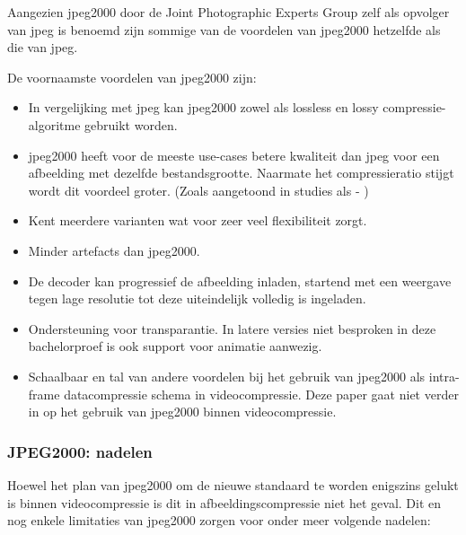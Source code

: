 Aangezien \gls{jpeg2000} door de Joint Photographic Experts Group zelf als opvolger van \gls{jpeg} is benoemd zijn sommige van de voordelen van \gls{jpeg2000} hetzelfde als die van \gls{jpeg}.

De voornaamste voordelen van \gls{jpeg2000} zijn:

\begin{itemize}
	\item In vergelijking met \gls{jpeg} kan \gls{jpeg2000} zowel als \gls{lossless} en \gls{lossy} \gls{compressie-algoritme} gebruikt worden.
	
	\item \gls{jpeg2000} heeft voor de meeste \glspl{use-case} betere kwaliteit dan \gls{jpeg} voor een afbeelding met dezelfde bestandsgrootte. Naarmate het compressieratio stijgt wordt dit voordeel groter. (Zoals aangetoond in studies als  - \cite{jpegvsjpeg2000quality})
	
	\item Kent meerdere varianten wat voor zeer veel flexibiliteit zorgt.
	
	\item Minder \glspl{artefact} dan \gls{jpeg2000}.
	
	\item De  \gls{decoder} kan progressief de afbeelding inladen, startend met een weergave tegen lage resolutie tot deze uiteindelijk volledig is ingeladen.
	
	\item Ondersteuning voor transparantie. In latere versies niet besproken in deze bachelorproef is ook support voor animatie aanwezig.
	
	\item Schaalbaar en tal van andere voordelen bij het gebruik van \gls{jpeg2000} als \gls{intra-frame} \gls{datacompressie} schema in \gls{videocompressie}. Deze paper gaat niet verder in op het gebruik van \gls{jpeg2000} binnen \gls{videocompressie}.
\end{itemize}

\subsubsection{JPEG2000: nadelen}
\label{sec:afbeeldingscompressie-jpeg2000-nadelen}

Hoewel het plan van \gls{jpeg2000} om de nieuwe standaard te worden enigszins gelukt is binnen \gls{videocompressie} is dit in \gls{afbeeldingscompressie} niet het geval. Dit en nog enkele limitaties van \gls{jpeg2000} zorgen voor onder meer volgende nadelen:

